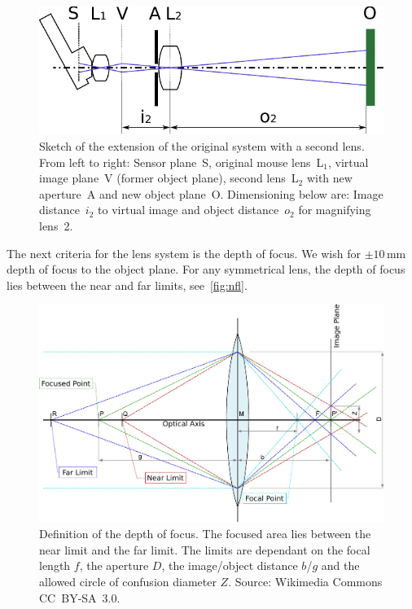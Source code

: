 \documentclass[12pt,a4paper]{article}
\begin{document}
\begin{figure}[htbp]
\begin{center}
\includegraphics[width=1\columnwidth]{figures/sketch-optic-2lens}
\caption{\label{fig:sk2l}
Sketch of the extension of the original system with a second lens.
From left to right: 
Sensor plane~S,
original mouse lens~L$_1$, 
virtual image plane~V (former object plane),
second lens~L$_2$ with new aperture~A and
new object plane~O.
Dimensioning below are: 
Image distance~$i_2$ to virtual image and object distance~$o_2$ for magnifying lens~2. %
}
\end{center}
\end{figure}

The next criteria for the lens system is the depth of focus.
We wish for $\pm 10$\,mm depth of focus to the object plane.
For any symmetrical lens, the depth of focus lies between the near and far limits, see~\autoref{fig:nfl}.
\begin{figure}[htbp]
\includegraphics[width=1\columnwidth]{figures/near_farpoints}
\caption{\label{fig:nfl}
Definition of the depth of focus.
The focused area lies between the near limit and the far limit.
The limits are dependant on the focal length $f$, the aperture $D$, the image/object distance $b$/$g$ and the allowed circle of confusion diameter $Z$.
Source: Wikimedia Commons\footnotemark\, CC~BY-SA~3.0.
}
\end{figure}
\end{document}
